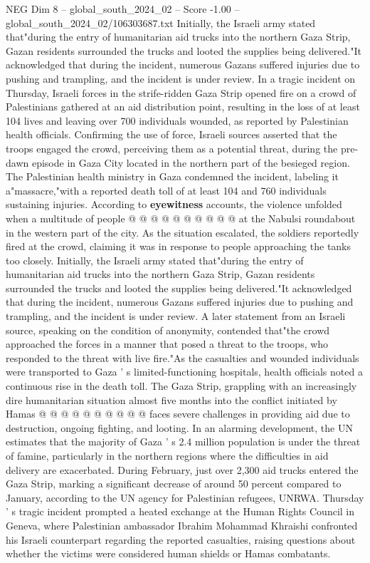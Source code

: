 \begin{textsample}{NEG Dim 8 – global\_south\_2024\_02 – Score -1.00 – global\_south\_2024\_02/106303687.txt}  \label{ex:f8_neg_252}
Initially, the Israeli army stated that"during the entry of humanitarian aid trucks into the northern Gaza Strip, Gazan residents surrounded the trucks and looted the supplies being delivered."It acknowledged that during the incident, numerous Gazans suffered injuries due to pushing and trampling, and the incident is under review.
In a tragic incident on Thursday, Israeli forces in the strife-ridden Gaza Strip opened fire on a crowd of Palestinians gathered at an aid distribution point, resulting in the loss of at least 104 lives and leaving over 700 individuals wounded, as reported by Palestinian health officials.
Confirming the use of force, Israeli sources asserted that the troops engaged the crowd, perceiving them as a potential threat, during the pre-dawn episode in Gaza City located in the northern part of the besieged region.
The Palestinian health ministry in Gaza condemned the incident, labeling it a"massacre,"with a reported death toll of at least 104 and 760 individuals sustaining injuries.
According to \textbf{eyewitness} accounts, the violence unfolded when a multitude of people @ @ @ @ @ @ @ @ @ @ at the Nabulsi roundabout in the western part of the city.
As the situation escalated, the soldiers reportedly fired at the crowd, claiming it was in response to people approaching the tanks too closely.
Initially, the Israeli army stated that"during the entry of humanitarian aid trucks into the northern Gaza Strip, Gazan residents surrounded the trucks and looted the supplies being delivered."It acknowledged that during the incident, numerous Gazans suffered injuries due to pushing and trampling, and the incident is under review.
A later statement from an Israeli source, speaking on the condition of anonymity, contended that"the crowd approached the forces in a manner that posed a threat to the troops, who responded to the threat with live fire."As the casualties and wounded individuals were transported to Gaza ' s limited-functioning hospitals, health officials noted a continuous rise in the death toll.
The Gaza Strip, grappling with an increasingly dire humanitarian situation almost five months into the conflict initiated by Hamas @ @ @ @ @ @ @ @ @ @ faces severe challenges in providing aid due to destruction, ongoing fighting, and looting.
In an alarming development, the UN estimates that the majority of Gaza ' s 2.4 million population is under the threat of famine, particularly in the northern regions where the difficulties in aid delivery are exacerbated.
During February, just over 2,300 aid trucks entered the Gaza Strip, marking a significant decrease of around 50 percent compared to January, according to the UN agency for Palestinian refugees, UNRWA.
Thursday ' s tragic incident prompted a heated exchange at the Human Rights Council in Geneva, where Palestinian ambassador Ibrahim Mohammad Khraishi confronted his Israeli counterpart regarding the reported casualties, raising questions about whether the victims were considered human shields or Hamas combatants.

\end{textsample}
